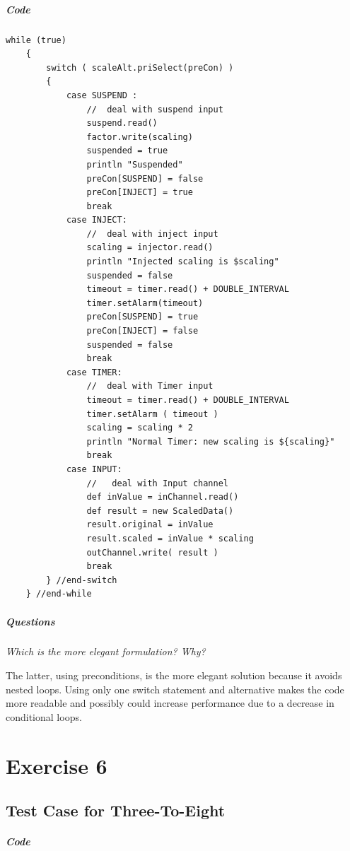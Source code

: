 \documentclass[10pt, a4paper]{article}
\begin{document}
	\subparagraph{Code} \hfill
	
	\begin{lstlisting}[caption = "Scale.groovy"]
	while (true)
	{
		switch ( scaleAlt.priSelect(preCon) )
		{
			case SUSPEND :
				//  deal with suspend input      
				suspend.read()
				factor.write(scaling)
				suspended = true
				println "Suspended"		
				preCon[SUSPEND] = false
				preCon[INJECT] = true  
				break
			case INJECT:
				//  deal with inject input
				scaling = injector.read()
				println "Injected scaling is $scaling"
				suspended = false
				timeout = timer.read() + DOUBLE_INTERVAL
				timer.setAlarm(timeout)
				preCon[SUSPEND] = true
				preCon[INJECT] = false
				suspended = false
				break
			case TIMER:
				//  deal with Timer input
				timeout = timer.read() + DOUBLE_INTERVAL
				timer.setAlarm ( timeout )
				scaling = scaling * 2
				println "Normal Timer: new scaling is ${scaling}"
				break
			case INPUT:
				//   deal with Input channel 
				def inValue = inChannel.read()
				def result = new ScaledData()
				result.original = inValue
				result.scaled = inValue * scaling
				outChannel.write( result )
				break
		} //end-switch
	} //end-while		\end{lstlisting}
	
	\subparagraph{Questions} \hfill
	
	\textit{Which is the more elegant formulation? Why?}
   
   The latter, using preconditions, is the more elegant solution because it avoids nested loops. Using only one switch statement and alternative makes the code more readable and possibly could increase performance due to a decrease in conditional loops.
   
   	\setcounter{section}{6}
   \section*{Exercise 6}
   
   \setcounter{subsection}{0}
   \subsection{Test Case for Three-To-Eight} \hfill
   
   \subparagraph{Code} \hfill
   
\end{document}
